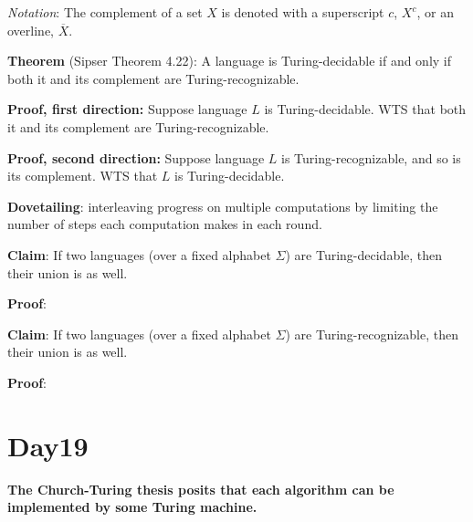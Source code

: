 \documentclass[12pt, oneside]{article}
\begin{document}
{\it Notation}: The complement  of a set $X$ is denoted with  a superscript $c$, $X^c$, or an overline,  $\overline{X}$.

{\bf  Theorem} (Sipser Theorem 4.22): A  language is Turing-decidable if and only if both  it and its complement
are Turing-recognizable.

{\bf Proof, first direction:}  Suppose  language  $L$ is  Turing-decidable.   WTS  that both it and its complement 
are Turing-recognizable.

\vfill

{\bf Proof, second direction:}  Suppose  language  $L$ is  Turing-recognizable, and  so is  its complement.   WTS  that $L$
is Turing-decidable.
\vfill




\newpage

\vfill

\vfill

{\bf Dovetailing}: interleaving progress on multiple computations by 
limiting the number of steps each computation makes in each round.
\newpage

{\bf Claim}: If two languages  (over a fixed alphabet  $\Sigma$) are Turing-decidable, then  their union  is  as well.

{\bf Proof}:


\vfill
\newpage

{\bf Claim}: If two languages  (over a fixed alphabet  $\Sigma$) are Turing-recognizable, then  their union  is  as well.

{\bf Proof}:

 \vfill
\section*{Day19}


{\bf The Church-Turing thesis posits that each algorithm can be implemented by some Turing machine.}
\end{document}

